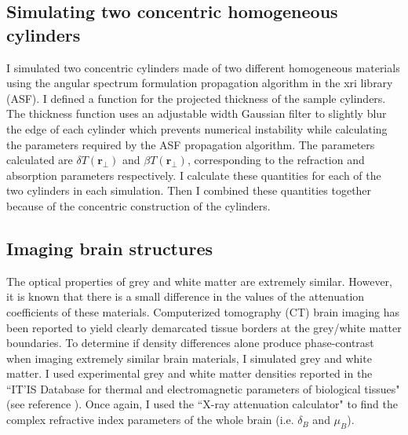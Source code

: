 \documentclass[10pt, a4paper, singlespacing]{report}
\begin{document}

\subsection{Simulating two concentric homogeneous cylinders}\label{2 cylinders}
I simulated two concentric cylinders made of two different homogeneous materials using the angular spectrum formulation propagation algorithm in the xri library (ASF). I defined a function for the projected thickness of the sample cylinders. The thickness function uses an adjustable width Gaussian filter to slightly blur the edge of each cylinder which prevents numerical instability while calculating the parameters required by the ASF propagation algorithm. The parameters calculated are $\delta T(\mathbf{r}_{\perp})$ and $\beta T(\mathbf{r}_{\perp})$, corresponding to the refraction and absorption parameters respectively. I calculate these quantities for each of the two cylinders in each simulation. Then I combined these quantities together because of the concentric construction of the cylinders.


\subsection{Imaging brain structures}\label{Brainz}
The optical properties of grey and white matter are extremely similar. However, it is known that there is a small difference in the values of the attenuation coefficients of these materials. Computerized tomography (CT) brain imaging has been reported to yield clearly demarcated tissue borders at the grey/white matter boundaries\cite{Beltran2}. To determine if density differences alone produce phase-contrast when imaging extremely similar brain materials, I simulated grey and white matter. I used experimental grey and white matter densities reported in the ``IT’IS Database for thermal and electromagnetic parameters of biological tissues" (see reference \cite{ITIS}). Once again, I used the ``X-ray attenuation calculator" to find the complex refractive index parameters of the whole brain (i.e. $\delta_B$ and $\mu_B$). 
\end{document}
